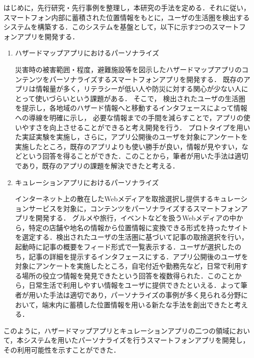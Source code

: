 \documentclass[a4paper]{jsarticle}
\begin{document}
はじめに，先行研究・先行事例を整理し，本研究の手法を定める．それに従い，スマートフォン内部に蓄積された位置情報をもとに，ユーザの生活圏を検出するシステムを構築する．このシステムを基盤として，以下に示す2つのスマートフォンアプリを開発する．
\begin{enumerate}
  \item ハザードマップアプリにおけるパーソナライズ

  災害時の被害範囲・程度，避難施設等を図示したハザードマップアプリのコンテンツをパーソナライズするスマートフォンアプリを開発する．
  既存のアプリは情報量が多く，リテラシーが低い人や防災に対する関心が少ない人にとって使いづらいという課題がある．
  そこで，
  検出されたユーザの生活圏を提示し，各地域のハザード情報へと移動するインタフェースによって情報への導線を明確に示し，
  必要な情報までの手間を減らすことで，アプリの使いやすさを向上させることができると考え開発を行う．
  プロトタイプを用いた実証実験を実施し，さらに，アプリ公開後のユーザを対象にアンケートを実施したところ，既存のアプリよりも使い勝手が良い，情報が見やすい，などという回答を得ることができた．このことから，筆者が用いた手法は適切であり，既存のアプリの課題を解決できたと考える．

  \item キュレーションアプリにおけるパーソナライズ

  インターネット上の散在したWebメディアを取捨選択し提供するキュレーションサービスを対象に，コンテンツをパーソナライズするスマートフォンアプリを開発する．
  グルメや旅行，イベントなどを扱うWebメディアの中から，特定の店舗や地名の情報から位置情報に変換できる形式を持ったサイトを選定する．検出されたユーザの生活圏に基づいて記事の取捨選択を行い，起動時に記事の概要をフィード形式で一覧表示する．ユーザが選択したのち，記事の詳細を提示するインタフェースにする．アプリ公開後のユーザを対象にアンケートを実施したところ，自宅付近や勤務先など，日常で利用する場所の役立つ情報を発見できたという回答を複数得られた．このことから，日常生活で利用しやすい情報をユーザに提供できたといえる．よって筆者が用いた手法は適切であり，パーソナライズの事例が多く見られる分野において，端末内に蓄積した位置情報を用いる新たな手法を創出できたと考える．
\end{enumerate}

このように，ハザードマップアプリとキュレーションアプリの二つの領域において，本システムを用いたパーソナライズを行うスマートフォンアプリを開発し，その利用可能性を示すことができた．
\end{document}
